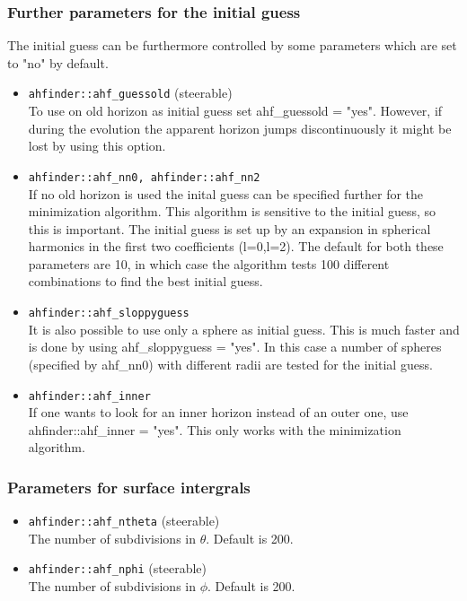 \subsubsection*{Further parameters for the initial guess}
The initial guess can be furthermore controlled by some parameters
which are set to "no" by default.
\begin{itemize}
\item {\tt ahfinder::ahf\_guessold} (steerable) \\
        To use on old horizon as initial guess set ahf\_guessold = "yes".
        However, if during the evolution the apparent horizon jumps
        discontinuously it might be lost by using this option.
\item {\tt ahfinder::ahf\_nn0, ahfinder::ahf\_nn2} \\
        If no old horizon is used the inital guess can be specified
        further for the minimization algorithm. This algorithm is
        sensitive to the initial guess, so this is important. The initial
        guess is set up by an expansion in spherical harmonics in the
        first two coefficients (l=0,l=2). The default for both these
        parameters are 10, in which case the algorithm tests 100 different
        combinations to find the best initial guess.
\item {\tt ahfinder::ahf\_sloppyguess} \\
        It is also possible to use only a sphere as initial guess. This
        is much faster and is done by using ahf\_sloppyguess = "yes". In this
        case a number of spheres (specified by ahf\_nn0) with different radii
        are tested for the initial guess.
\item {\tt ahfinder::ahf\_inner} \\
        If one wants to look for an inner horizon instead of an outer
        one, use ahfinder::ahf\_inner = "yes". This only works with the
        minimization algorithm.
\end{itemize}
\subsubsection*{Parameters for surface intergrals}
\begin{itemize}
\item {\tt ahfinder::ahf\_ntheta} (steerable) \\
        The number of subdivisions in $\theta$. Default is 200.
\item {\tt ahfinder::ahf\_nphi} (steerable) \\
        The number of subdivisions in $\phi$. Default is 200.
\end{itemize}
